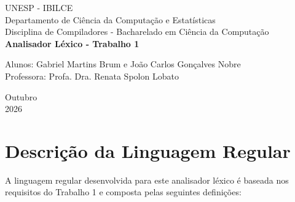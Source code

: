 \documentclass[a4paper, 12pt]{article}
\begin{document}

\begin{titlepage}
	\begin{center}
	

		\Large{UNESP - IBILCE}\\
		\large{Departamento de Ciência da Computação e Estatísticas}\\ 
		\large{Disciplina de Compiladores - Bacharelado em Ciência da Computação}\\ 
		\vspace{15pt}
        \vspace{95pt}
        \textbf{\LARGE{Analisador Léxico - Trabalho 1}}\\
		\vspace{3,5cm}
	\end{center}
	
	\begin{flushleft}
		\begin{tabbing}
			Alunos: Gabriel Martins Brum e João Carlos Gonçalves Nobre \\
			Professora: Profa. Dra. Renata Spolon Lobato
	\end{tabbing}
 \end{flushleft}
	\vspace{1cm}
	
	\begin{center}
		\vspace{\fill}
			 Outubro\\
		 2026
			\end{center}
\end{titlepage}



\newpage
{}

\section{Descrição da Linguagem Regular}

A linguagem regular desenvolvida para este analisador léxico é baseada nos requisitos do Trabalho 1 e composta pelas seguintes definições:
\end{document}
